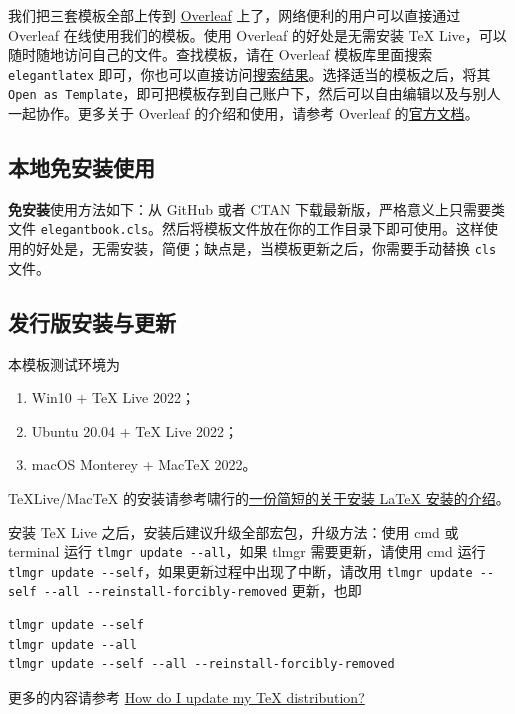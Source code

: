 我们把三套模板全部上传到 \href{https://www.overleaf.com/}{Overleaf} 上了，网络便利的用户可以直接通过 Overleaf 在线使用我们的模板。使用 Overleaf 的好处是无需安装 \TeX{} Live，可以随时随地访问自己的文件。查找模板，请在 Overleaf 模板库里面搜索 \lstinline{elegantlatex} 即可，你也可以直接访问\href{https://www.overleaf.com/latex/templates?addsearch=elegantlatex}{搜索结果}。选择适当的模板之后，将其 \lstinline{Open as Template}，即可把模板存到自己账户下，然后可以自由编辑以及与别人一起协作。更多关于 Overleaf 的介绍和使用，请参考 Overleaf 的\href{https://www.overleaf.com/learn}{官方文档}。

\subsection{本地免安装使用}

\textbf{免安装}使用方法如下：从 GitHub 或者 CTAN 下载最新版，严格意义上只需要类文件 \lstinline{elegantbook.cls}。然后将模板文件放在你的工作目录下即可使用。这样使用的好处是，无需安装，简便；缺点是，当模板更新之后，你需要手动替换 \lstinline{cls} 文件。

\subsection{发行版安装与更新}

本模板测试环境为 
\begin{enumerate}
  \item Win10 + \TeX{} Live 2022；
  \item Ubuntu 20.04 + \TeX{} Live 2022；
  \item macOS Monterey + Mac\TeX{} 2022。
\end{enumerate}

\TeX Live/Mac\TeX{} 的安装请参考啸行的\href{https://github.com/OsbertWang/install-latex-guide-zh-cn/releases/}{一份简短的关于安装 \LaTeX{} 安装的介绍}。

安装 \TeX{} Live 之后，安装后建议升级全部宏包，升级方法：使用 cmd 或 terminal 运行 \lstinline{tlmgr update --all}，如果 tlmgr 需要更新，请使用 cmd 运行 \lstinline{tlmgr update --self}，如果更新过程中出现了中断，请改用 \lstinline{tlmgr update --self --all --reinstall-forcibly-removed} 更新，也即

\begin{lstlisting}
tlmgr update --self 
tlmgr update --all
tlmgr update --self --all --reinstall-forcibly-removed
\end{lstlisting}

更多的内容请参考 \href{https://tex.stackexchange.com/questions/55437/how-do-i-update-my-tex-distribution}{How do I update my \TeX{} distribution?}

